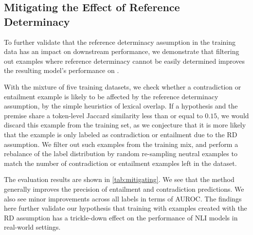 \subsection{Mitigating the Effect of Reference Determinacy}
\label{ssec:mitigating}
To further validate that the reference determinacy assumption in the training data has an impact on downstream performance, we demonstrate that filtering out examples where reference determinacy cannot be easily determined improves the resulting model's performance on \datasetname. 

With the mixture of five training datasets, we check whether a contradiction or entailment example is likely to be affected by the reference determinacy assumption, by the simple heuristics of lexical overlap. If a hypothesis and the premise share a token-level Jaccard similarity less than or equal to $0.15$, we would discard this example from the training set, as we conjecture that it is more likely
that the example is only labeled as contradiction or entailment due to the RD assumption. We filter out such examples from the training mix, and perform a rebalance of the label distribution by random re-sampling neutral examples to match the number of contradiction or entailment examples left in the dataset.  

The evaluation results are shown in \autoref{tab:mitigating}. We see that the method generally improves the precision of entailment and contradiction predictions. We also see minor improvements across all labels in terms of AUROC. The findings here further validate our hypothesis that training with examples created with the RD assumption has a trickle-down effect on the performance of NLI models in real-world settings.